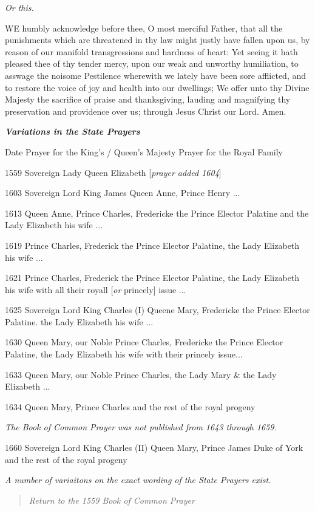 \emph{Or
this.}

WE
humbly acknowledge before thee, O most merciful Father, that all the punishments
which are threatened in thy law might justly have fallen upon us, by reason
of our manifold transgressions and hardness of heart: Yet seeing it hath
pleased thee of thy tender mercy, upon our weak and unworthy humiliation,
to asswage the noisome Pestilence wherewith we lately have been sore afflicted,
and to restore the voice of joy and health into our dwellings; We offer
unto thy Divine Majesty the sacrifice of praise and thanksgiving, lauding
and magnifying thy preservation and providence over us; through Jesus
Christ our Lord. Amen.

\emph{\textbf{Variations
in the State Prayers}}

Date Prayer
for the King's / Queen's Majesty Prayer
for the Royal Family

1559 Sovereign Lady Queen
Elizabeth [\emph{prayer
added 1604}]

1603 Sovereign
Lord King James Queen Anne, Prince
Henry ...

1613 Queen Anne, Prince
Charles, Fredericke the Prince Elector Palatine and the Lady Elizabeth his
wife ...

1619 Prince Charles, Frederick
the Prince Elector Palatine, the Lady Elizabeth his wife ...

1621 Prince Charles, Frederick
the Prince Elector Palatine, the Lady Elizabeth his wife with all their
royall [\emph{or}
princely] issue ...

1625 Sovereign
Lord King Charles (I) Queene Mary, Fredericke
the Prince Elector Palatine. the Lady Elizabeth his wife ...

1630 Queen Mary, our Noble
Prince Charles, Fredericke the Prince Elector Palatine, the Lady Elizabeth
his wife with their princely issue...

1633 Queen Mary, our Noble
Prince Charles, the Lady Mary \& the Lady Elizabeth ...

1634 Queen Mary, Prince
Charles and the rest of the royal progeny

\emph{The
Book of Common Prayer was not published from 1643 through 1659.}

1660 Sovereign
Lord King Charles (II) Queen Mary, Prince
James Duke of York and the rest of the royal progeny

\emph{A
number of variaitons on the exact wording of the State Prayers exist.}

\begin{quote}

\emph{Return to the 1559
Book of Common Prayer}

\end{quote}

